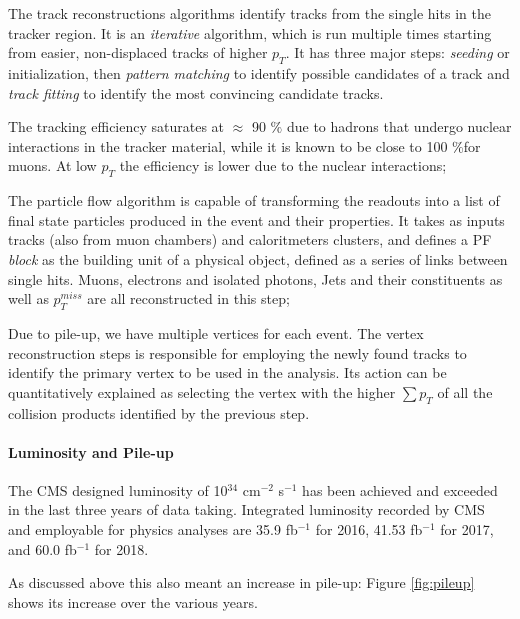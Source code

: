 \begin{outline}
    \1 The track reconstructions algorithms identify tracks from the single hits in the tracker region. It is an \emph{iterative} algorithm, which is run multiple times starting from easier, non-displaced tracks of higher $p_T$. It has three major steps: \emph{seeding} or initialization, then \emph{pattern matching} to identify possible candidates of a track and \emph{track fitting} to identify the most convincing candidate tracks.
    
    The tracking efficiency saturates at $\approx$ 90 $\%$ due to hadrons that undergo nuclear interactions in the tracker material, while it is known to be close to 100 $\%$for muons. At low $p_T$ the efficiency is lower due to the nuclear interactions;
    
    \1 The particle flow algorithm is capable of transforming the readouts into a list of final state particles produced in the event and their properties. It takes as inputs tracks (also from muon chambers) and caloritmeters clusters, and defines a PF \emph{block} as the building unit of a physical object, defined as a series of links between single hits. Muons, electrons and isolated photons, Jets and their constituents as well as $p_T^{miss}$ are all reconstructed in this step; 
    
    \1 Due to pile-up, we have multiple vertices for each event. The vertex reconstruction steps is responsible for employing the newly found tracks to identify the primary vertex to be used in the analysis. Its action can be quantitatively explained as selecting the vertex with the higher $\sum p_T$ of all the collision products identified by the previous step.
\end{outline}

\paragraph{Luminosity and Pile-up}

 The CMS designed luminosity of 10$^{34}$ cm$^{-2}$ s$^{-1}$ has been achieved and exceeded in the last three years of data taking. Integrated luminosity recorded by CMS and employable for physics analyses are 35.9 fb$^{-1}$ for 2016, 41.53 fb$^{-1}$ for 2017, and 60.0 fb$^{-1}$ for 2018.

As discussed above this also meant an increase in pile-up: Figure \ref{fig:pileup} shows its increase over the various years.

